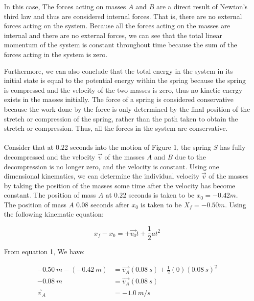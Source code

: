 \documentclass[12pt]{article}
\begin{document}
In this case, The forces acting on masses $A$ and $B$ are a direct result of Newton's third law and thus are considered internal forces. That is, there are no external forces acting on the system. Because all the forces acting on the masses are internal and there are no external forces, we can see that the total linear momentum of the system is constant throughout time because the sum of the forces acting in the system is zero.

Furthermore, we can also conclude that the total energy in the system in its initial state is equal to the potential energy within the spring because the spring is compressed and the velocity of the two masses is zero, thus no kinetic energy exists in the masses initially. The force of a spring is considered conservative because the work done by the force is only determined by the final position of the stretch or compression of the spring, rather than the path taken to obtain the stretch or compression. Thus, all the forces in the system are conservative.

\paragraph{}

Consider that at 0.22 seconds into the motion of Figure 1, the spring $S$ has fully decompressed and the velocity $\vec{v}$ of the masses $A$ and $B$ due to the decompression is no longer zero, and the velocity is constant. Using one dimensional kinematics, we can determine the individual velocity $\vec{v}$ of the masses by taking the position of the masses some time after the velocity has become constant. The position of mass $A$ at $0.22$ seconds is taken to be $x_0 = -0.42 m$. The position of mass $A$ $0.08$ seconds after $x_0$ is taken to be $X_f = -0.50m$. Using the following kinematic equation:

\begin{equation} \label{eq1}
    x_f - x_0= + \vec{v_0}t + \frac{1}{2}at^2
\end{equation}

From equation 1, We have:

\begin{equation*}
    \begin{split}
        \SI{-0.50}{m} - (\SI{-0.42}{m}) & = \vec{v_A}(\SI{0.08}{s}) + \frac{1}{2}(0)(\SI{0.08}{s})^2 \\
        \SI{-0.08}{m} & = \vec{v_A}(\SI{0.08}{s}) \\
        \vec{v}_A & = \SI{-1.0}{m/s}
    \end{split}
\end{equation*}
\end{document}
